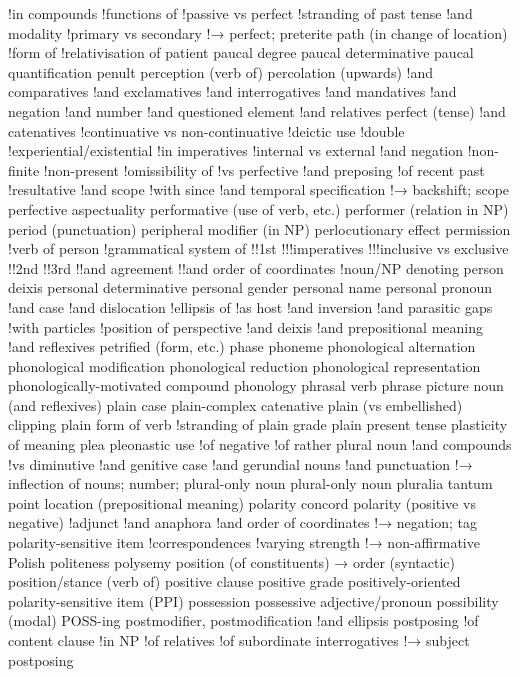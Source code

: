 !in compounds
!functions of
!passive vs perfect
!stranding of
past tense
!and modality
!primary vs secondary
!→ perfect; preterite
path (in change of location)
!form of
!relativisation of
patient
paucal degree
paucal determinative
paucal quantification
penult
perception (verb of)
percolation (upwards)
!and comparatives
!and exclamatives
!and interrogatives
!and mandatives
!and negation
!and number
!and questioned element
!and relatives
perfect (tense)
!and catenatives
!continuative vs non-continuative
!deictic use
!double
!experiential/existential
!in imperatives
!internal vs external
!and negation
!non-finite
!non-present
!omissibility of
!vs perfective
!and preposing
!of recent past
!resultative
!and scope
!with since
!and temporal specification
!→ backshift; scope
perfective aspectuality
performative (use of verb, etc.)
performer (relation in NP)
period (punctuation)
peripheral modifier (in NP)
perlocutionary effect
permission
!verb of
person
!grammatical system of
!!1st
!!!imperatives
!!!inclusive vs exclusive
!!2nd
!!3rd
!!and agreement
!!and order of coordinates
!noun/NP denoting
person deixis
personal determinative
personal gender
personal name
personal pronoun
!and case
!and dislocation
!ellipsis of
!as host
!and inversion
!and parasitic gaps
!with particles
!position of
perspective
!and deixis
!and prepositional meaning
!and reflexives
petrified (form, etc.)
phase
phoneme
phonological alternation
phonological modification
phonological reduction
phonological representation
phonologically-motivated compound
phonology
phrasal verb
phrase
picture noun (and reflexives)
plain case
plain-complex catenative
plain (vs embellished) clipping
plain form of verb
!stranding of
plain grade
plain present tense
plasticity of meaning
plea
pleonastic use
!of negative
!of rather
plural noun
!and compounds
!vs diminutive
!and genitive case
!and gerundial nouns
!and punctuation
!→ inflection of nouns; number; plural-only noun
plural-only noun
pluralia tantum
point location (prepositional meaning)
polarity concord
polarity (positive vs negative)
!adjunct
!and anaphora
!and order of coordinates
!→ negation; tag
polarity-sensitive item
!correspondences
!varying strength
!→ non-affirmative
Polish
politeness
polysemy
position (of constituents) → order (syntactic)
position/stance (verb of)
positive clause
positive grade
positively-oriented polarity-sensitive item (PPI)
possession
possessive adjective/pronoun
possibility (modal)
POSS-ing
postmodifier, postmodification
!and ellipsis
postposing
!of content clause
!in NP
!of relatives
!of subordinate interrogatives
!→ subject postposing
